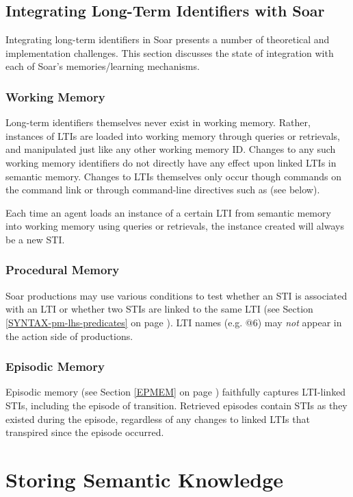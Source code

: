 \subsection{Integrating Long-Term Identifiers with Soar}
Integrating long-term identifiers in Soar presents a number of theoretical and implementation challenges.  
This section discusses the state of integration with each of Soar's memories/learning mechanisms.

\subsubsection{Working Memory}
Long-term identifiers themselves never exist in working memory. Rather, instances of LTIs are loaded into working memory through queries or retrievals, and manipulated just like any other working memory ID. Changes to any such working memory identifiers do not directly have any effect upon linked LTIs in semantic memory. Changes to LTIs themselves only occur though  commands on the command link  or through command-line directives such as  (see below).

Each time an agent loads an instance of a certain LTI from semantic memory into working memory using queries or retrievals, the instance created will always be a new STI.

\subsubsection{Procedural Memory}
Soar productions may use various conditions to test whether an STI is associated with an LTI or whether two STIs are linked to the same LTI (see Section \ref{SYNTAX-pm-lhs-predicates} on page \pageref{SYNTAX-pm-lhs-predicates}).
LTI names (e.g. {@}6) may \emph{not} appear in the action side of productions.

\subsubsection{Episodic Memory}
Episodic memory (see Section \ref{EPMEM} on page \pageref{EPMEM}) faithfully captures LTI-linked STIs, including the episode of transition. 
Retrieved episodes contain STIs as they existed during the episode, regardless of any changes to linked LTIs that transpired since the episode occurred.

\section{Storing Semantic Knowledge}
\label{SMEM-store}

